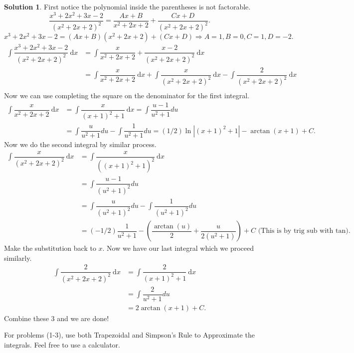 \documentclass[10pt]{article}
\newcommand{\dx}{\:\mathrm{d}x}
\theoremstyle{Theorem}
\theoremstyle{definition}
\newtheorem*{solution}{Solution}
\theoremstyle{remark}
\theoremstyle{custom}
\begin{document}
\begin{enumerate}[1.]
\begin{solution}
First notice the polynomial inside the parentheses is not factorable.
\[
\dfrac{x^3+2x^2+3x-2}{(x^2+2x+2)^2}=\dfrac{Ax+B}{x^2+2x+2}+\dfrac{Cx+D}{(x^2+2x+2)^2}.
\]
\[
x^3+2x^2+3x-2=(Ax+B)(x^2+2x+2)+(Cx+D) \Rightarrow A=1, B=0, C=1, D=-2.
\]
\begin{align*}
\int \dfrac{x^3+2x^2+3x-2}{(x^2+2x+2)^2}\dx&=\int \dfrac{x}{x^2+2x+2}+\dfrac{x-2}{(x^2+2x+2)^2}\dx\\[2pt]
&=\int \dfrac{x}{x^2+2x+2}\dx+ \int \dfrac{x}{(x^2+2x+2)^2}\dx-\int \dfrac{2}{(x^2+2x+2)^2}\dx\\[2pt]
\end{align*}
Now we can use completing the square on the denominator for the first integral.
\begin{align*}
\int \dfrac{x}{x^2+2x+2}\dx&=\int \dfrac{x}{(x+1)^2+1}\dx = \int \dfrac{u-1}{u^2+1}du\\[2pt]
&=\int \dfrac{u}{u^2+1}du - \int \dfrac{1}{u^2+1}du=(1/2)\ln|(x+1)^2+1|-\arctan(x+1)+C.
\end{align*}
Now we do the second integral by similar process.
\begin{align*}
 \int \dfrac{x}{(x^2+2x+2)^2}\dx&= \int \dfrac{x}{((x+1)^2+1)^2}\dx\\[2pt]
 &=\int \dfrac{u-1}{(u^2+1)^2}du\\[2pt]
 &=\int \dfrac{u}{(u^2+1)^2}du-\int \dfrac{1}{(u^2+1)^2}du\\[2pt]
 &=(-1/2)\dfrac{1}{u^2+1}-\left(\dfrac{\arctan(u)}{2}+\dfrac{u}{2(u^2+1)}\right)+C \text{ (This is by trig sub with tan)}.
 \end{align*}
 Make the substitution back to $x$. Now we have our last integral which we proceed similarly.
\begin{align*}
\int \dfrac{2}{(x^2+2x+2)^2}\dx&=\int \dfrac{2}{(x+1)^2+1}\dx\\[2pt]
&=\int \dfrac{2}{u^2+1}du\\[2pt]
&= 2\arctan(x+1)+C.
\end{align*}
Combine these 3 and we are done!
\end{solution}
\end{enumerate}
For problems (1-3), use both Trapezoidal and Simpson's Rule to Approximate the integrals. Feel free to use a calculator.
\end{document}
